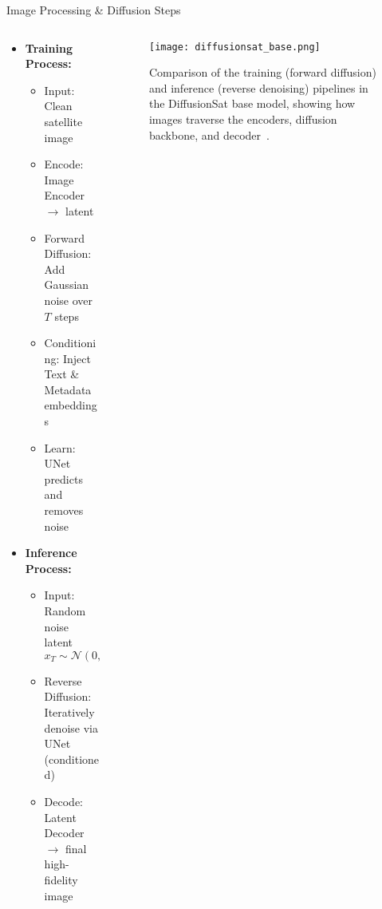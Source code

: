 \begin{refsection}
  \begin{frame}{Image Processing \& Diffusion Steps}
    \begin{columns}[t]
      \begin{column}{0.5\textwidth}
        \tiny
        \begin{itemize}
          \item \textbf{Training Process:}
          \begin{itemize}
            \item Input: Clean satellite image
            \item Encode: Image Encoder $\rightarrow$ latent
            \item Forward Diffusion: Add Gaussian noise over \(T\) steps
            \item Conditioning: Inject Text \& Metadata embeddings
            \item Learn: UNet predicts and removes noise
          \end{itemize}
          \item \textbf{Inference Process:}
          \begin{itemize}
            \item Input: Random noise latent \(x_T\!\sim\!\mathcal{N}(0,I)\)
            \item Reverse Diffusion: Iteratively denoise via UNet (conditioned)
            \item Decode: Latent Decoder $\rightarrow$ final high-fidelity image
          \end{itemize}
        \end{itemize}
      \end{column}
      \begin{column}{0.5\textwidth}
        \begin{figure}
          \centering
          \texttt{[image: diffusionsat\_base.png]}
          \caption{\scriptsize Comparison of the training (forward diffusion) and inference (reverse denoising) pipelines in the DiffusionSat base model, showing how images traverse the encoders, diffusion backbone, and decoder~\parencite{diffusionset2024}.}
        \end{figure}
      \end{column}
    \end{columns}
    \bottomleftrefs
  \end{frame}
\end{refsection}

